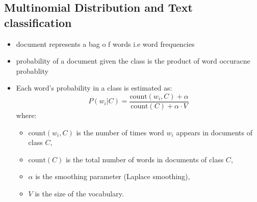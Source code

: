 \documentclass{article}
\begin{document}
\subsection*{Multinomial Distribution and Text classification}
\begin{itemize}
    \item document represents a bag o f words i.e word frequencies
    \item probability of a document given the class is the product of word occuracne probablity
    \item Each word's probability in a class is estimated as:
    \[
    P(w_i|C) = \frac{\text{count}(w_i, C) + \alpha}{\text{count}(C) + \alpha \cdot V}
    \]
    where:
    \begin{itemize}
        \item \(\text{count}(w_i, C)\) is the number of times word \(w_i\) appears in documents of class \(C\),
        \item \(\text{count}(C)\) is the total number of words in documents of class \(C\),
        \item \(\alpha\) is the smoothing parameter (Laplace smoothing),
        \item \(V\) is the size of the vocabulary.
    \end{itemize}
\end{itemize}
\end{document}
